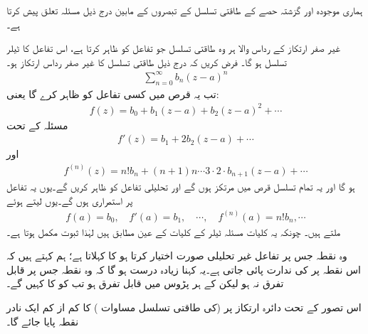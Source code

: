 ہماری موجودہ اور گزشتہ حصے کے  طاقتی تسلسل کے تبصروں کے مابین درج ذیل مسئلہ تعلق پیش کرتا ہے۔

غیر صفر ارتکاز کے رداس والا ہر وہ طاقتی تسلسل جو تفاعل کو ظاہر کرتا ہے، اس تفاعل کا ٹیلر تسلسل ہو گا۔ 
\quad
فرض کریں کہ درج ذیل طاقتی تسلسل کا غیر صفر رداس ارتکاز  ہو۔
\begin{align*}
\sum\limits_{n=0}^{\infty}b_n(z-a)^n
\end{align*}
تب یہ قرص  میں کسی تفاعل  کو ظاہر کرے گا یعنی:
\begin{align*}
f(z)=b_0+b_1(z-a)+b_2(z-a)^2+\cdots
\end{align*}
مسئلہ  کے تحت
\begin{align*}
f'(z)=b_1+2b_2(z-a)+\cdots
\end{align*}
اور
\begin{align*}
f^{(n)}(z)=n!b_n+(n+1)n\cdots 3\cdot 2\cdot b_{n+1}(z-a)+\cdots
\end{align*}
ہو گا اور یہ تمام تسلسل قرص  میں مرتکز ہوں گے اور تحلیلی تفاعل کو ظاہر کریں گے۔یوں یہ تفاعل  پر استمراری  ہوں گے۔یوں  لیتے ہوئے 
\begin{align*}
f(a)=b_0,\quad f'(a)=b_1,\quad \cdots,\quad f^{(n)}(a)=n!b_n,\cdots
\end{align*}
ملتے ہیں۔ چونکہ یہ کلیات مسئلہ ٹیلر  کے کلیات کے  عین مطابق ہیں لہٰذا ثبوت مکمل ہوتا ہے۔

وہ نقطہ جس پر تفاعل  غیر تحلیلی صورت اختیار کرتا ہو  کا  کہلاتا ہے؛ ہم کہتے ہیں کہ اس نقطہ پر  کی ندارت پائی جاتی ہے۔یہ کہنا زیادہ درست ہو گا کہ وہ نقطہ  جس پر  قابل تفرق نہ ہو لیکن  کے ہر پڑوس میں  قابل تفرق ہو تب  کو  کا  کہیں گے۔ 

اس تصور کے تحت دائرہ ارتکاز پر  (کی طاقتی تسلسل مساوات ) کا کم از کم ایک نادر نقطہ پایا جائے گا۔ 

